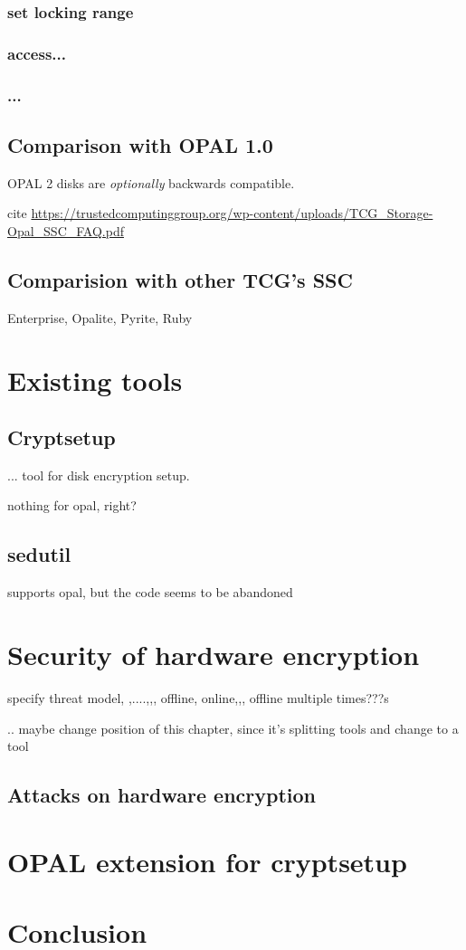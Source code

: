 \documentclass[
  digital, %
  oneside, %
  nolof,     %
  nolot,     %
]{fithesis4}
\begin{document}
\subsection{set locking range}
\subsection{access...}
\subsection{...}


\section{Comparison with OPAL 1.0}

OPAL 2 disks are \emph{optionally} backwards compatible.

cite \url{https://trustedcomputinggroup.org/wp-content/uploads/TCG_Storage-Opal_SSC_FAQ.pdf}

\section{Comparision with other TCG's SSC}

Enterprise, Opalite, Pyrite, Ruby

\chapter{Existing tools}

\section{Cryptsetup}

... tool for disk encryption setup.

nothing for opal, right?

\section{sedutil}

supports opal, but the code seems to be abandoned

\chapter{Security of hardware encryption}

specify threat model, ,....,,, offline, online,,, offline multiple times???s

.. maybe change position of this chapter, since it's splitting tools and change to a tool

\section{Attacks on hardware encryption}

\chapter{OPAL extension for cryptsetup}

\chapter{Conclusion}



\printbibliography[heading=bibintoc] %
\end{document}
